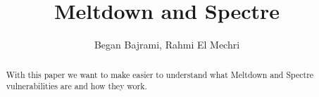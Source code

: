 \documentclass[10pt, a4paper, twocolumn]{article}
\date{\displaydate{date}}
\title{Meltdown and Spectre}
\author{Began Bajrami, Rahmi El Mechri}
\begin{document}
\maketitle
\begin{abstract}
With this paper we want to make easier to understand what Meltdown and Spectre vulnerabilities are and how they work.
\end{abstract}













\end{document}
